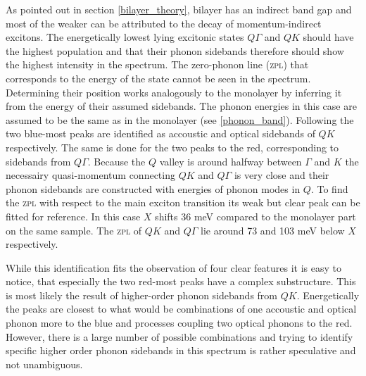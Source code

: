 As pointed out in section \ref{bilayer_theory}, bilayer \wse has an indirect band gap and most of the weaker \pl can be attributed to the decay of momentum-indirect excitons. The energetically lowest lying excitonic states $Q\Gamma$ and $QK$ should have the highest population and that their phonon sidebands therefore should show the highest intensity in the spectrum. The zero-phonon line (\textsc{zpl}) that corresponds to the energy of the state cannot be seen in the spectrum. Determining their position works analogously to the monolayer by inferring it from the energy of their assumed sidebands. The phonon energies in this case are assumed to be the same as in the monolayer (see \ref{phonon_band}). Following \cite{lindlau_role_2017} the two blue-most peaks are identified as  accoustic and optical sidebands of $QK$ respectively. The same is done for the two peaks to the red, corresponding to sidebands from $Q\Gamma$. Because the $Q$ valley is around halfway between $\Gamma$ and $K$ the necessairy quasi-momentum connecting $QK$ and $Q\Gamma$ is very close and their phonon sidebands are constructed with energies of phonon modes in $Q$. To find the \textsc{zpl} with respect to the main exciton transition its weak but clear peak can be fitted for reference. In this case $X$ shifts 36 meV compared to the monolayer part on the same sample. The \textsc{zpl} of $QK$ and $Q\Gamma$ lie around 73 and 103 meV below $X$ respectively.

While this identification fits the observation of four clear features it is easy to notice, that especially the two red-most peaks have a complex substructure. This is most likely the result of higher-order phonon sidebands from $QK$. Energetically the peaks are closest to what would be combinations of one accoustic and optical phonon more to the blue and processes coupling two optical phonons to the red. However, there is a large number of possible combinations and trying to identify specific higher order phonon sidebands in this spectrum is rather speculative and not unambiguous.

